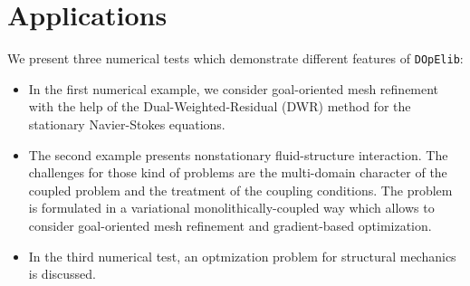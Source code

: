 \documentclass[prodmode,acmtoms]{acmsmall}
\numberwithin{equation}{section}
\newcommand{\deal}{\texttt{deal.II}}
\newcommand{\dope}{\texttt{DOpElib}}
\newcommand{\todo}[1]{\textbf{\textsc{\textcolor{black}{TODO: #1}}}}
\begin{document}
%
%
%
%
%
%
%
\section{Applications}
\label{applications}
We present three numerical tests which demonstrate different
features of \dope:
\begin{itemize}
\item In the first numerical example, we consider 
goal-oriented mesh refinement with the help of the 
Dual-Weighted-Residual (DWR) method for the stationary Navier-Stokes equations.
\item The second example presents nonstationary fluid-structure 
interaction. The challenges for those kind of problems are the multi-domain
character of the coupled problem and the treatment of the coupling conditions.
The problem is formulated in a variational monolithically-coupled way which 
allows to consider goal-oriented mesh refinement and gradient-based optimization.
\item In the third numerical test, an optmization problem for structural mechanics
is discussed.
\end{itemize}
\end{document}
